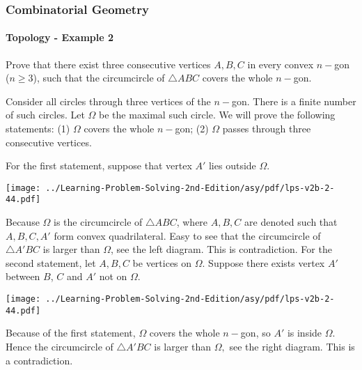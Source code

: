 \documentclass[8pt,xcolor=table,dvipsnames]{beamer}
\begin{document}
\begin{frame}[t]
    \frametitle{Combinatorial Geometry}
    \framesubtitle{Topology - Example 2}
    \begin{example}[LPS V2B/2.44]
        Prove that there exist three consecutive vertices $A,B,C$ in every convex $n-$gon ($n \ge 3$),
        such that the circumcircle of $\triangle ABC$ covers the whole $n-$gon.
    \end{example}
    \begin{overprint}
        Consider all circles through three vertices of the $n-$gon. There is a finite number of such circles.
        Let $\Omega$ be the maximal such circle. We will prove the following statements:
        (1) $\Omega$ covers the whole $n-$gon; (2) $\Omega$ passes through three consecutive vertices.

        For the first statement, suppose that vertex $A'$ lies outside $\Omega.$
        \begin{center}
            \texttt{[image: ../Learning-Problem-Solving-2nd-Edition/asy/pdf/lps-v2b-2-44.pdf]}
        \end{center}
        Because $\Omega$ is the circumcircle of $\triangle ABC$, where $A,B,C$ are denoted such that $A,B,C,A'$ form convex quadrilateral.
        Easy to see that the circumcircle of $\triangle A'BC$ is larger than $\Omega$, see the left diagram.
        This is contradiction.
        For the second statement, let $A,B,C$ be vertices on $\Omega$.
        Suppose there exists vertex $A'$ between $B$, $C$ and $A'$ not on $\Omega$.
        \begin{center}
            \texttt{[image: ../Learning-Problem-Solving-2nd-Edition/asy/pdf/lps-v2b-2-44.pdf]}
        \end{center}
        Because of the first statement, $\Omega$ covers the whole $n-$gon, so $A'$ is inside $\Omega.$
        Hence the circumcircle of $\triangle A'BC$ is larger than $\Omega,$ see the right diagram.
        This is a contradiction.    
    \end{overprint}
\end{frame}
\end{document}
